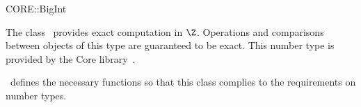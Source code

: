 \ccDefGlobalScope{}
\begin{ccRefClass}{CORE::BigInt}

\ccDefinition

The class \ccRefName\ provides exact computation in $\Z$.
Operations and comparisons between objects of this type are guaranteed 
to be exact.  
This number type is provided by the {\sc Core} library~\cite{klpy-clp-99}.

\cgal\ defines the necessary functions so that this class complies to the
requirements on number types.


\ccIsModel
{}\\
\\

\end{ccRefClass}
